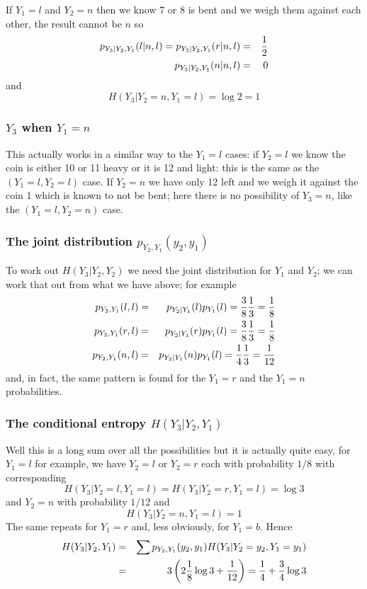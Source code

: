 \documentclass[12pt]{article}
\begin{document}
If $Y_1=l$ and $Y_2=n$ then we know 7 or 8 is bent and we weigh them against each other, the result cannot be $n$ so
\begin{eqnarray}
p_{Y_3|Y_2,Y_1}(l|n,l)=p_{Y_3|Y_2,Y_1}(r|n,l)&=&\frac{1}{2}\cr
p_{Y_3|Y_2,Y_1}(n|n,l)&=&0
\end{eqnarray}
and
\begin{equation}
H(Y_3|Y_2=n,Y_1=l)=\log{2}=1
\end{equation}

\subsubsection*{$Y_3$ when $Y_1=n$}

This actually works in a similar way to the $Y_1=l$ cases: if $Y_2=l$
we know the coin is either 10 or 11 heavy or it is 12 and light: this
is the same as the $(Y_1=l,Y_2=l)$ case. If $Y_2=n$ we have only 12
left and we weigh it against the coin 1 which is known to not be bent; here there is no possibility of $Y_3=n$, like the $(Y_1=l,Y_2=n)$ case.

\subsubsection*{The joint distribution $p_{Y_2,Y_1}(y_2,y_1)$}
To work out $H(Y_3|Y_2,Y_2)$ we need the joint distribution for $Y_1$
and $Y_2$; we can work that out from what we have above; for example
\begin{eqnarray}
p_{Y_2,Y_1}(l,l)&=&p_{Y_2|Y_1}(l)p_{Y_1}(l)=\frac{3}{8}\frac{1}{3}=\frac{1}{8}\cr
p_{Y_2,Y_1}(r,l)&=&p_{Y_2|Y_1}(r)p_{Y_1}(l)=\frac{3}{8}\frac{1}{3}=\frac{1}{8}\cr
p_{Y_2,Y_1}(n,l)&=&p_{Y_2|Y_1}(n)p_{Y_1}(l)=\frac{1}{4}\frac{1}{3}=\frac{1}{12}
\end{eqnarray}
and, in fact, the same pattern is found for the $Y_1=r$ and the $Y_1=n$ probabilities.


\subsubsection*{The conditional entropy $H(Y_3|Y_2,Y_1)$}
Well this is a long sum over all the possibilities but it is actually
quite easy, for $Y_1=l$ for example, we have $Y_2=l$ or $Y_2=r$ each with probability $1/8$ with corresponding 
\begin{equation}
H(Y_3|Y_2=l,Y_1=l)=H(Y_3|Y_2=r,Y_1=l)=\log{3}
\end{equation}
and $Y_2=n$ with probability $1/12$ and 
\begin{equation}
H(Y_3|Y_2=n,Y_1=l)=1
\end{equation}
The same repeats for $Y_1=r$ and, less obviously, for $Y_1=b$. Hence
\begin{eqnarray}
H(Y_3|Y_2,Y_1)&=&\sum{p_{Y_2,Y_1}(y_2,y_1)H(Y_3|Y_2=y_2,Y_1=y_1)}\cr
&=&3\left(2\frac{1}{8}\log{3}+\frac{1}{12}\right)=\frac{1}{4}+\frac{3}{4}\log{3}
\end{eqnarray}
\end{document}
